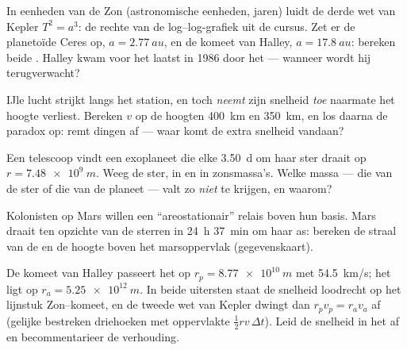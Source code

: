 \begin{exercise}[$\star\star$]\label{exo:g12:satellites-kepler:11}
In eenheden van de Zon (astronomische eenheden, jaren) luidt de derde wet van
Kepler $T^2 = a^3$: de rechte van de log--log-grafiek uit de cursus. Zet er de
planetoïde Ceres op, $a = \qty{2.77}{au}$, en de komeet van Halley,
$a = \qty{17.8}{au}$: bereken beide . Halley kwam voor het laatst
in 1986 door het  --- wanneer wordt hij terugverwacht?
\end{exercise}

\begin{exercise}[$\star\star\star$]\label{exo:g12:satellites-kepler:12}
IJle lucht strijkt langs het station, en toch \emph{neemt} zijn snelheid
\emph{toe} naarmate het hoogte verliest. Bereken $v$ op de hoogten
\qty{400}{km} en \qty{350}{km}, en los daarna de paradox op:  remt
dingen af --- waar komt de extra snelheid vandaan?
\end{exercise}

\begin{exercise}[$\star\star\star$]\label{exo:g12:satellites-kepler:13}
Een telescoop vindt een exoplaneet die elke \qty{3.50}{d} om haar ster draait
op $r = \qty{7.48e9}{m}$. Weeg de ster, in  en in zonsmassa's. Welke
massa --- die van de ster of die van de planeet --- valt zo \emph{niet} te
krijgen, en waarom?
\end{exercise}

\begin{exercise}[$\star\star\star$]\label{exo:g12:satellites-kepler:14}
Kolonisten op Mars willen een ``areostationair'' relais boven hun basis. Mars
draait ten opzichte van de sterren in \qty{24}{h} \qty{37}{min} om haar as:
bereken de straal van de  en de hoogte boven het marsoppervlak
(gegevenskaart).
\end{exercise}

\begin{exercise}[$\star\star\star$]\label{exo:g12:satellites-kepler:15}
De komeet van Halley passeert het  op $r_p = \qty{8.77e10}{m}$ met
\qty{54.5}{km/s}; het  ligt op $r_a = \qty{5.25e12}{m}$. In beide
uitersten staat de snelheid loodrecht op het lijnstuk Zon--komeet, en de
tweede wet van Kepler dwingt dan $r_p v_p = r_a v_a$ af (gelijke bestreken
driehoeken met oppervlakte $\tfrac12 r v\,\Delta t$). Leid de snelheid in het
 af en becommentarieer de verhouding.
\end{exercise}

